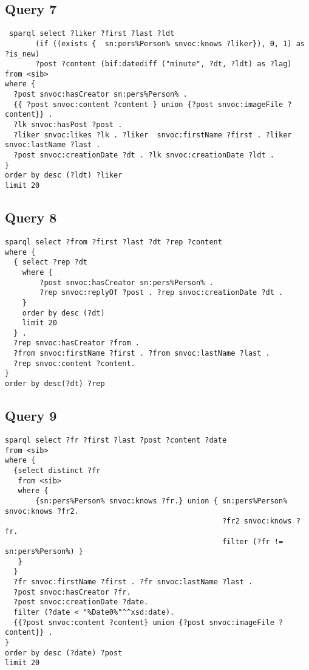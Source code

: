 \subsection{Query 7}
{\footnotesize
\begin{verbatim}
 sparql select ?liker ?first ?last ?ldt 
       (if ((exists {  sn:pers%Person% snvoc:knows ?liker}), 0, 1) as ?is_new)
       ?post ?content (bif:datediff ("minute", ?dt, ?ldt) as ?lag) 
from <sib>
where {
  ?post snvoc:hasCreator sn:pers%Person% .
  {{ ?post snvoc:content ?content } union {?post snvoc:imageFile ?content}} .
  ?lk snvoc:hasPost ?post .
  ?liker snvoc:likes ?lk . ?liker  snvoc:firstName ?first . ?liker snvoc:lastName ?last . 
  ?post snvoc:creationDate ?dt . ?lk snvoc:creationDate ?ldt .
}
order by desc (?ldt) ?liker
limit 20
\end{verbatim}
}

 

\subsection{Query 8}

{\footnotesize
\begin{verbatim}
sparql select ?from ?first ?last ?dt ?rep ?content 
where {
  { select ?rep ?dt
    where {
        ?post snvoc:hasCreator sn:pers%Person% .
        ?rep snvoc:replyOf ?post . ?rep snvoc:creationDate ?dt .
    }
    order by desc (?dt)
    limit 20
  } .
  ?rep snvoc:hasCreator ?from .
  ?from snvoc:firstName ?first . ?from snvoc:lastName ?last . 
  ?rep snvoc:content ?content.
}
order by desc(?dt) ?rep
\end{verbatim}
}

\subsection{Query 9}

{\footnotesize
\begin{verbatim}
sparql select ?fr ?first ?last ?post ?content ?date 
from <sib>
where {
  {select distinct ?fr
   from <sib>
   where {
       {sn:pers%Person% snvoc:knows ?fr.} union { sn:pers%Person% snvoc:knows ?fr2.
                                                  ?fr2 snvoc:knows ?fr.
                                                  filter (?fr != sn:pers%Person%) }
   }
  }
  ?fr snvoc:firstName ?first . ?fr snvoc:lastName ?last .
  ?post snvoc:hasCreator ?fr.
  ?post snvoc:creationDate ?date.
  filter (?date < "%Date0%"^^xsd:date).
  {{?post snvoc:content ?content} union {?post snvoc:imageFile ?content}} .
}
order by desc (?date) ?post
limit 20
\end{verbatim}
}

